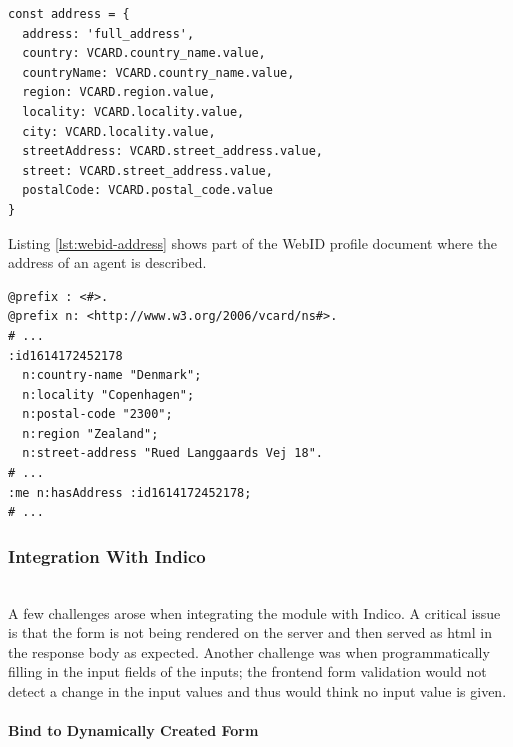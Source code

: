 \begin{lstlisting}[language=Other,columns=fullflexible, caption={Dictionary to map extracted values with predicates from Turtle resource}, label={lst:autocomplete-mapping}]
const address = {
  address: 'full_address',
  country: VCARD.country_name.value,
  countryName: VCARD.country_name.value,
  region: VCARD.region.value,
  locality: VCARD.locality.value,
  city: VCARD.locality.value,
  streetAddress: VCARD.street_address.value,
  street: VCARD.street_address.value,
  postalCode: VCARD.postal_code.value
}
\end{lstlisting}

Listing \ref{lst:webid-address} shows part of the WebID profile document where the address of an agent is described.

\begin{lstlisting}[language=Other,columns=fullflexible, caption={Extraction from WebID profile document showing address.}, label={lst:webid-address}]
@prefix : <#>.
@prefix n: <http://www.w3.org/2006/vcard/ns#>.
# ...
:id1614172452178
  n:country-name "Denmark";
  n:locality "Copenhagen";
  n:postal-code "2300";
  n:region "Zealand";
  n:street-address "Rued Langgaards Vej 18". 
# ...
:me n:hasAddress :id1614172452178;
# ...
\end{lstlisting}

\vspace{0.5cm}
\subsubsection{Integration With Indico}\mbox{}\\

A few challenges arose when integrating the module with Indico. A critical issue is that the form is not being rendered on the server and then served as \gls{html} in the response body as expected. Another challenge was when programmatically filling in the input fields of the inputs; the frontend form validation would not detect a change in the input values and thus would think no input value is given.

\vspace{0.5cm}
\paragraph{Bind to Dynamically Created Form}\label{poc2-bind}\mbox{}\\

